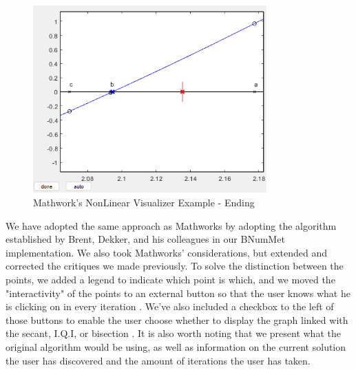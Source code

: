 \begin{figure}[H]
    \centering
    \includegraphics[width=0.8\textwidth]{Include/Images/Thesis/Development/Visualizers/NON LINEAR VISUALIZER/Mathworks.NonLinear.Ex1.1.png}
    \caption{Mathwork's NonLinear Visualizer Example - Ending}
    \label{fig:Mathwork's NonLinear Visualizer Example - Ending}
\end{figure}

We have adopted the same approach as Mathworks by adopting the algorithm established by Brent, Dekker, and his colleagues in our BNumMet implementation. We also took Mathworks' considerations, but extended and corrected the critiques we made previously. To solve the distinction between the points, we added a legend to indicate which point is which, and we moved the "interactivity" of the points to an external button so that the user knows what he is clicking on in every iteration . We've also included a checkbox to the left of those buttons to enable the user choose whether to display the graph linked with the secant, I.Q.I, or bisection . It is also worth noting that we present what the original algorithm would be using, as well as information on the current solution the user has discovered and the amount of iterations the user has taken.


